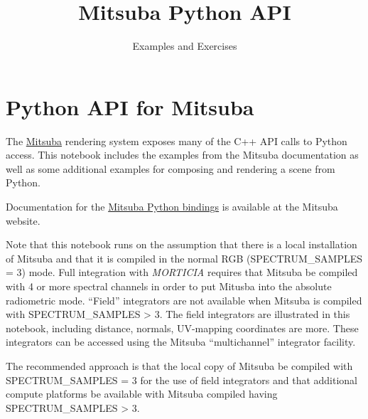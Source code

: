\documentclass[11pt, a4paper, landscape]{scrartcl}
\title{Mitsuba Python API}\subtitle{Examples and Exercises}
\begin{document}
    
    
    \maketitle
    
    

    
    \section{Python API for Mitsuba}\label{python-api-for-mitsuba}

The \href{http://www.mitsuba-renderer.org/}{Mitsuba} rendering system
exposes many of the C++ API calls to Python access. This notebook
includes the examples from the Mitsuba documentation as well as some
additional examples for composing and rendering a scene from Python.

Documentation for the
\href{http://www.mitsuba-renderer.org/api/group__libpython.html}{Mitsuba
Python bindings} is available at the Mitsuba website.

Note that this notebook runs on the assumption that there is a local
installation of Mitsuba and that it is compiled in the normal RGB
(SPECTRUM\_SAMPLES = 3) mode. Full integration with \emph{MORTICIA}
requires that Mitsuba be compiled with 4 or more spectral channels in
order to put Mitusba into the absolute radiometric mode. ``Field''
integrators are not available when Mitsuba is compiled with
SPECTRUM\_SAMPLES \textgreater{} 3. The field integrators are
illustrated in this notebook, including distance, normals, UV-mapping
coordinates are more. These integrators can be accessed using the
Mitsuba ``multichannel'' integrator facility.

The recommended approach is that the local copy of Mitsuba be compiled
with SPECTRUM\_SAMPLES = 3 for the use of field integrators and that
additional compute platforms be available with Mitsuba compiled having
SPECTRUM\_SAMPLES \textgreater{} 3.
\end{document}
